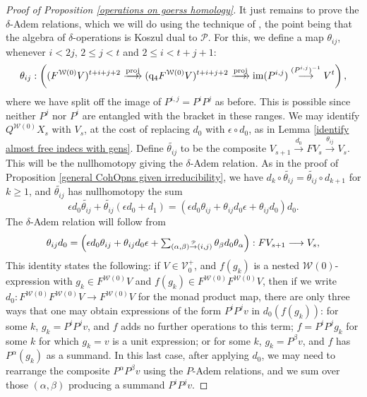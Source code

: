 \documentclass[11pt]{amsart} \renewcommand{\baselinestretch}{1.2}
\theoremstyle{plain}
\numberwithin{equation}{section} %
\theoremstyle{plain}
\numberwithin{equation}{chapter} %
\DeclareMathOperator{\im}{im}
\renewcommand{\to}{\longrightarrow}
\newcommand{\calP}{\mathcal{P}}
\newcommand{\calV}{\mathcal{V}}
\newcommand{\calw}{\mathcal{W}}
\newcommand{\Palg}{{\calP}}
\newcommand{\vect}[2]{\calV^{#1}_{#2}}
\newcommand{\quadgrad}[1]{\mathrm{q}_{#1}}
\newcommand{\produces}[3]{#3:#1\sim #2}
\renewcommand{\produces}[3]{#1\rightarrow_{#3} #2}%
\renewcommand{\produces}[3]{#1\overset{\smash{#3}}{\rightarrow} #2}%
\begin{document}
\begin{Cohomology Operations for W and U}
\begin{proof}[Proof of Proposition \ref{operations on goerss homology}]
It just remains to prove the $\delta$-Adem relations, which we will do using the technique of \cite{PriddyKoszul.pdf}, the point being that the algebra of $\delta$-operations is Koszul dual to $\Palg$. For this, we define a map $\theta_{ij}$, whenever $i<2j$, $2\leq j<t$ and $2\leq i<t+j+1$:
\[\theta_{ij}:\left((F^{\calw(0)}V)^{t+i+j+2}\overset{\textup{proj}}{\makebox[.06ex][l]{$\to$}\to} (\quadgrad{4}F^{\calw(0)}V)^{t+i+j+2}\overset{\textup{proj}}{\makebox[.06ex][l]{$\to$}\to} \im (P^{i,j})\overset{(P^{i,j})^{-1}}{\to}V^{t}\right),\]
where we have split off the image of 
$P^{i,j}=P^iP^j$ %
as before. This is possible since neither $P^j$ nor $P^i$ are entangled with the bracket in these ranges. We may identify $Q^{\calw(0)}X_s$ with $V_s$, at the cost of replacing $d_0$ with $\epsilon\circ d_0$, as in Lemma \ref{identify almost free indecs with gens}.  Define $\widetilde{\theta_{ij}}$ to be the composite $V_{s+1}\overset{d_0}{\to}FV_s\overset{\theta_{ij}}{\to}V_s$. This will be the nullhomotopy giving the $\delta$-Adem relation. %
As in the proof of Proposition \ref{general CohOpns given irreducibility}, we have $d_k\circ\widetilde{\theta_{ij}}=\widetilde{\theta_{ij}}\circ d_{k+1}$ for $k\geq1$, and $\widetilde{\theta_{ij}}$ has nullhomotopy the sum
\[\epsilon d_0\widetilde{\theta_{ij}}+\widetilde{\theta_{ij}}(\epsilon d_0+d_1)=(\epsilon d_0\theta_{ij}+\theta_{ij}d_0\epsilon+\theta_{ij}d_0)d_0.\]
The $\delta$-Adem relation will follow from
\[\textstyle\theta_{ij}d_0=\Bigl(\epsilon d_0\theta_{ij}+\theta_{ij}d_0\epsilon+\sum_{\produces{(\alpha,\beta)}{(i,j)}{\Palg}}\theta_\beta d_0\theta_\alpha\Bigr):FV_{s+1}\to V_s,\]
This identity states the following: if $V\in\vect{+}{0}$, and $f(g_k)$ is a nested $\calw(0)$-expression with $g_k\in F^{\calw(0)}V$ and $f(g_k)\in F^{\calw(0)}F^{\calw(0)}V$, then if we write $d_0:F^{\calw(0)}F^{\calw(0)}V\to F^{\calw(0)}V$ for the monad product map, there are only three ways that one may obtain expressions of the form $P^iP^jv$ in $d_0(f(g_k))$: for some $k$, $g_k=P^iP^jv$, and $f $ adds no further operations to this term; $f=P^iP^jg_{k}$ for some $k$ for which $g_{k}=v$ is a unit expression; or for some $k$, $g_k=P^\beta v$, and  $f$ has $P^\alpha(g_k)$ as a summand. In this last case, after applying $d_0$, we may need to rearrange the composite $P^{\alpha}P^{\beta}v$ using the $P$-Adem relations, and we sum over those $(\alpha,\beta)$ producing a summand $P^iP^jv$.


\end{proof}
\end{Cohomology Operations for W and U}
\end{document}
